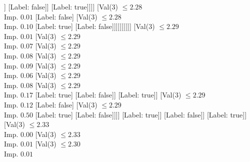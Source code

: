 \documentclass[margin=10pt]{standalone}
\begin{document}
\begin{forest}
															[Label: false]
															[Val($3$) $ \leq 2.27$ \\ Imp. $0.03$
																[Label: true]
																[Val($3$) $ \leq 2.28$ \\ Imp. $0.01$
																	[Val($3$) $ \leq 2.27$ \\ Imp. $0.10$
																		[Label: false]
																		[Val($3$) $ \leq 2.27$ \\ Imp. $0.08$
																			[Label: true]
																			[Val($3$) $ \leq 2.28$ \\ Imp. $0.11$
																				[Val($3$) $ \leq 2.28$ \\ Imp. $0.12$
																					[Val($3$) $ \leq 2.27$ \\ Imp. $0.50$
																						[Label: false]
																						[Label: true]]
																					[Label: false]]
																				[Label: true]]]]
																	[Val($3$) $ \leq 2.28$ \\ Imp. $0.01$
																		[Label: false]
																		[Val($3$) $ \leq 2.28$ \\ Imp. $0.10$
																			[Label: true]
																			[Label: false]]]]]]]]]]
										[Val($3$) $ \leq 2.29$ \\ Imp. $0.01$
											[Val($3$) $ \leq 2.29$ \\ Imp. $0.07$
												[Val($3$) $ \leq 2.29$ \\ Imp. $0.08$
													[Val($3$) $ \leq 2.29$ \\ Imp. $0.09$
														[Val($3$) $ \leq 2.29$ \\ Imp. $0.06$
															[Val($3$) $ \leq 2.29$ \\ Imp. $0.08$
																[Val($3$) $ \leq 2.29$ \\ Imp. $0.17$
																	[Label: true]
																	[Label: false]]
																[Label: true]]
															[Val($3$) $ \leq 2.29$ \\ Imp. $0.12$
																[Label: false]
																[Val($3$) $ \leq 2.29$ \\ Imp. $0.50$
																	[Label: true]
																	[Label: false]]]]
														[Label: true]]
													[Label: false]]
												[Label: true]]
											[Val($3$) $ \leq 2.33$ \\ Imp. $0.00$
												[Val($3$) $ \leq 2.33$ \\ Imp. $0.01$
													[Val($3$) $ \leq 2.30$ \\ Imp. $0.01$

\end{forest}
\end{document}
